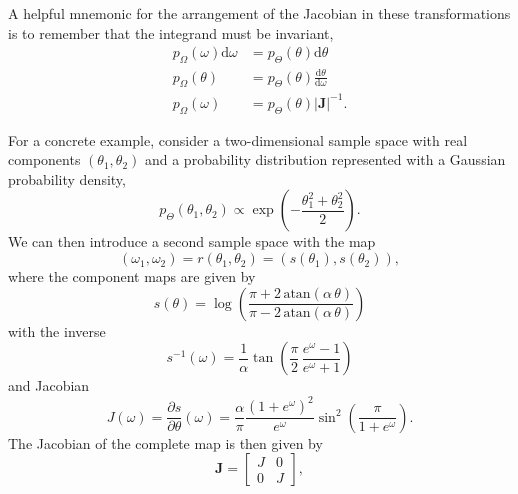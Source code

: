 \documentclass[11pt, oneside]{article}
\newcommand{\dd}{ \mathrm{d} }
\begin{document}
A helpful mnemonic for the arrangement of the Jacobian in these 
transformations is to remember that the integrand must be invariant,
%
\begin{align*}
p_{\Omega} \! \left( \omega \right) \dd \omega
&=
p_{\Theta} \! \left( \theta \right) \dd \theta
\\
p_{\Omega} \! \left( \theta \right)
&= 
p_{\Theta} \! \left( \theta \right) \frac{ \dd \theta }{ \dd \omega }
\\
p_{\Omega} \! \left( \omega \right)
&= 
p_{\Theta} \! \left( \theta \right) \left| \mathbf{J} \right|^{-1}.
\end{align*}

For a concrete example, consider a two-dimensional sample space 
with real components $\left( \theta_{1}, \theta_{2} \right)$ and a 
probability distribution represented with a Gaussian probability density,
%
\begin{equation*}
p_{\Theta} \! \left( \theta_{1}, \theta_{2} \right)
\propto
\exp \! \left( - \frac{\theta_{1}^{2} + \theta_{2}^{2}}{2} \right).
\end{equation*}
%
We can then introduce a second sample space with the map
%
\begin{equation*}
\left( \omega_{1}, \omega_{2} \right) 
= 
r \! \left( \theta_{1}, \theta_{2} \right) 
= 
\left( s \! \left( \theta_{1} \right), s \! \left( \theta_{2} \right) \right),
\end{equation*}
%
where the component maps are given by
%
\begin{equation*}
s \! \left( \theta \right)
=
\log \! \left(
\frac{ \pi + 2 \, \mathrm{atan} \! \left( \alpha \, \theta \right) }
{ \pi - 2 \, \mathrm{atan} \! \left( \alpha \, \theta \right) }
\right)
\end{equation*}
%
with the inverse
%
\begin{equation*}
s^{-1} \! \left( \omega \right)
=
\frac{1}{\alpha} 
\tan \! \left(
\frac{\pi}{2} \, \frac{e^{\omega} - 1}{e^{\omega} + 1} \right)
\end{equation*}
%
and Jacobian
%
\begin{equation*}
J \! \left( \omega \right)
=
\frac{ \partial s }{ \partial \theta } \! \left( \omega \right)
=
\frac{\alpha}{\pi} \frac{ \left( 1 + e^{\omega} \right)^{2} }{ e^{\omega} }
\sin^{2} \! \left( \frac{ \pi }{ 1 + e^{\omega} } \right).
\end{equation*}
%
The Jacobian of the complete map is then given by
%
\begin{equation*}
\mathbf{J} = 
\begin{bmatrix}
J & 0 \\
0 & J
\end{bmatrix},
\end{equation*}
\end{document}
